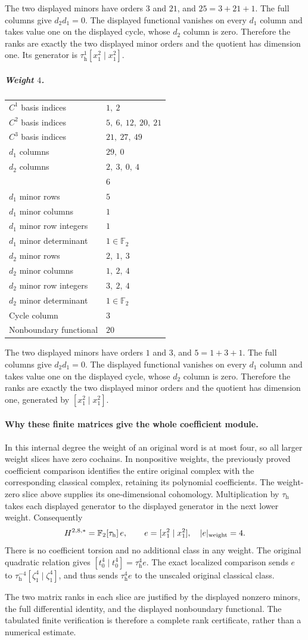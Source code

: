 The two displayed minors have orders $3$ and $21$, and $25=3+21+1$. 
The full columns give $d_2d_1=0$. The displayed functional vanishes on every $d_1$ column and takes value one on the displayed cycle, whose $d_2$ column is zero. Therefore the ranks are exactly the two displayed minor orders and the quotient has dimension one. Its generator is $\tau_{\mathrm h}^{1}[x_1^2\mid x_1^2]$.
\subparagraph{Weight $4$.}
\begin{longtable}{l l}
\endhead
$C^{1}$ basis indices & $1,\ 2$\\
$C^{2}$ basis indices & $5,\ 6,\ 12,\ 20,\ 21$\\
$C^{3}$ basis indices & $21,\ 27,\ 49$\\
$d_1$ columns & $29,\ 0$\\
$d_2$ columns & $2,\ 3,\ 0,\ 4$\\
 & $6$\\
$d_1$ minor rows & $5$\\
$d_1$ minor columns & $1$\\
$d_1$ minor row integers & $1$\\
$d_1$ minor determinant & $1\in\mathbb F_2$\\
$d_2$ minor rows & $2,\ 1,\ 3$\\
$d_2$ minor columns & $1,\ 2,\ 4$\\
$d_2$ minor row integers & $3,\ 2,\ 4$\\
$d_2$ minor determinant & $1\in\mathbb F_2$\\
Cycle column & $3$\\
Nonboundary functional & $20$\\
\end{longtable}
The two displayed minors have orders $1$ and $3$, and $5=1+3+1$. 
The full columns give $d_2d_1=0$. The displayed functional vanishes on every $d_1$ column and takes value one on the displayed cycle, whose $d_2$ column is zero. Therefore the ranks are exactly the two displayed minor orders and the quotient has dimension one, generated by $[x_1^2\mid x_1^2]$.
\paragraph{Why these finite matrices give the whole coefficient module.}
In this internal degree the weight of an original word is at most four,
so all larger weight slices have zero cochains. In nonpositive weights,
the previously proved coefficient comparison identifies the entire
original complex with the corresponding classical complex, retaining
its polynomial coefficients. The weight-zero slice above supplies its
one-dimensional cohomology. Multiplication by $\tau_{\mathrm h}$
takes each displayed generator to the displayed generator in the
next lower weight. Consequently
\[
 H^{2,8,*}=\mathbb F_2[\tau_{\mathrm h}]\,
 e,\qquad e=[x_1^2\mid x_1^2],\quad |e|_{\rm weight}=4.
\]
There is no coefficient torsion and no additional class in any weight.
The original quadratic relation gives
$[t_0^4\mid t_0^4]=\tau_{\mathrm h}^4e$.
The exact localized comparison sends $e$ to
$\tau_{\mathrm h}^{-4}[\zeta_1^4\mid\zeta_1^4]$, and thus
sends $\tau_{\mathrm h}^4e$ to the unscaled original classical class.

The two matrix ranks in each slice are justified by the displayed
nonzero minors, the full differential identity, and the displayed
nonboundary functional. The tabulated finite verification is therefore
a complete rank certificate, rather than a numerical estimate.

